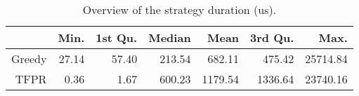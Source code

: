 \begin{table}[ht]
\centering
\begin{tabular}{rrrrrrr}
  \hline
 & Min. & 1st Qu. & Median & Mean & 3rd Qu. & Max. \\ 
  \hline
Greedy & 27.14 & 57.40 & 213.54 & 682.11 & 475.42 & 25714.84 \\ 
  TFPR & 0.36 & 1.67 & 600.23 & 1179.54 & 1336.64 & 23740.16 \\ 
   \hline
\end{tabular}
\caption{Overview of the strategy duration (us).} 
\label{tab:results:rq0:summary:duration}
\end{table}
